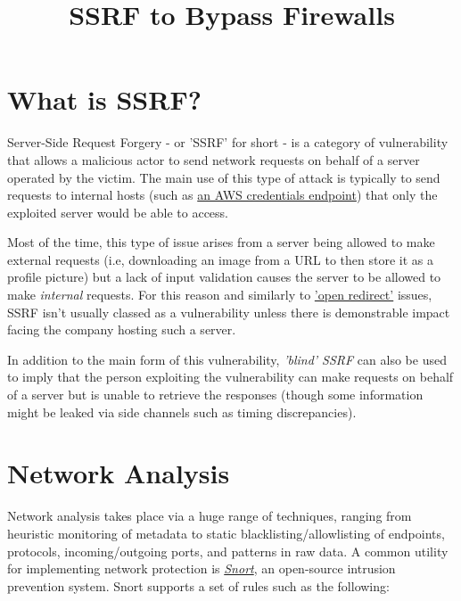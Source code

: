 \title{SSRF to Bypass Firewalls}

\section{What is SSRF?}

Server-Side Request Forgery - or 'SSRF' for short - is a category of vulnerability that
            allows a malicious actor to send network requests on behalf of a server operated by the victim.
            The main use of this type of attack is typically to send requests to internal hosts (such as
            \href{https://hackingthe.cloud/aws/exploitation/ec2-metadata-ssrf/}{an AWS credentials endpoint})
            that only the exploited server would be able to access.

Most of the time, this type of issue arises from a server being allowed to make external requests (i.e,
            downloading an image from a URL to then store it as a profile picture) but a lack of input validation
            causes the server to be allowed to make \textit{internal} requests. For this reason and similarly to
            \href{https://learn.snyk.io/lessons/open-redirect/javascript/}{'open redirect'} issues,
            SSRF isn't usually classed as a vulnerability unless there is demonstrable impact facing the company
            hosting such a server.

In addition to the main form of this vulnerability, \textit{'blind' SSRF} can also be used to imply that the person exploiting the vulnerability can
            make requests on behalf of a server but is unable to retrieve the responses (though some information
            might be leaked via side channels such as timing discrepancies).

\section{Network Analysis}

Network analysis takes place via a huge range of techniques, ranging from heuristic monitoring of metadata to static
            blacklisting/allowlisting of endpoints, protocols, incoming/outgoing ports, and patterns in raw data. A common utility
            for implementing network protection is \href{https://github.com/snort3/snort3}{\textit{Snort}},
            an open-source intrusion prevention system. Snort supports a set of rules such as the following:

